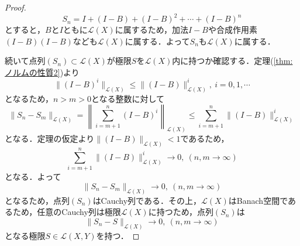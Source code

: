 \documentclass[11pt,a4paper]{jsarticle}
\theoremstyle{definition}
\begin{document}
\begin{proof}
  \begin{equation*}
    S_n = I + (I-B) + (I-B)^2 + \cdots + (I-B)^n
  \end{equation*}
  とすると，$B$と$I$ともに$\mathcal{L}(X)$に属するため，加法$I-B$や合成作用素$(I-B)(I-B)$なども$\mathcal{L}(X)$に属する．よって$S_n$も$\mathcal{L}(X)$に属する．

  続いて点列$(S_n)\subset\mathcal{L}(X)$が極限$S$を$\mathcal{L}(X)$内に持つか確認する．定理(\ref{thm:ノルムの性質2})より
  \begin{equation*}
    \|(I-B)^i\|_{\mathcal{L}(X)} \leq \|(I-B)\|_{\mathcal{L}(X)}^i,\ i=0,1,\cdots
  \end{equation*}
  となるため，$n>m>0$となる整数に対して
  \begin{equation*}
    \|S_n-S_m\|_{\mathcal{L}(X)} = \left \| \sum^n_{i=m+1}(I-B)^i \right \| _{\mathcal{L}(X)} \leq \sum^n_{i=m+1}\|(I-B)\|^i_{\mathcal{L}(X)}
  \end{equation*}
  となる．定理の仮定より$\|(I-B)\|_{\mathcal{L}(X)}<1$であるため，
  \begin{equation*}
    \sum^n_{i=m+1}\|(I-B)\|^i_{\mathcal{L}(X)} \rightarrow 0,\ (n,m\rightarrow \infty)
  \end{equation*}
  となる．よって
  \begin{equation*}
    \|S_n-S_m\|_{\mathcal{L}(X)} \rightarrow 0,\ (n,m\rightarrow \infty)
  \end{equation*}
  となるため，点列$(S_n)$はCauchy列である．その上，$\mathcal{L}(X)$はBanach空間であるため，任意のCauchy列は極限$\mathcal{L}(X)$に持つため，点列$(S_n)$は
  \begin{equation*}
    \|S_n-S\|_{\mathcal{L}(X)} \rightarrow 0,\ (n,m\rightarrow \infty)
  \end{equation*}
  となる極限$S\in\mathcal{L}(X,Y)$を持つ．


\end{proof}
\end{document}
